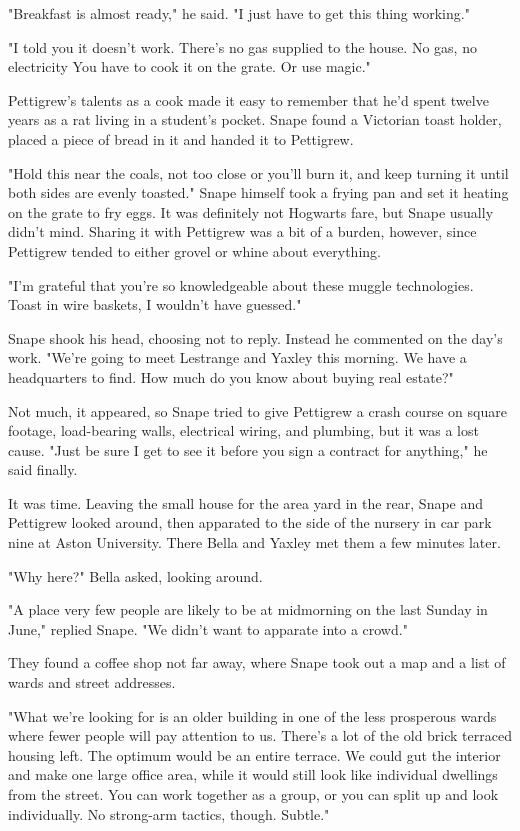 "Breakfast is almost ready," he said. "I just have to get this thing working."

"I told you it doesn't work. There's no gas supplied to the house. No gas, no electricity{\el} You have to cook it on the grate. Or use magic."

Pettigrew's talents as a cook made it easy to remember that he'd spent twelve years as a rat living in a student's pocket. Snape found a Victorian toast holder, placed a piece of bread in it and handed it to Pettigrew.

"Hold this near the coals, not too close or you'll burn it, and keep turning it until both sides are evenly toasted." Snape himself took a frying pan and set it heating on the grate to fry eggs. It was definitely not Hogwarts fare, but Snape usually didn't mind. Sharing it with Pettigrew was a bit of a burden, however, since Pettigrew tended to either grovel or whine about everything.

"I'm grateful that you're so knowledgeable about these muggle technologies. Toast in wire baskets, I wouldn't have guessed."

Snape shook his head, choosing not to reply. Instead he commented on the day's work. "We're going to meet Lestrange and Yaxley this morning. We have a headquarters to find. How much do you know about buying real estate?"

Not much, it appeared, so Snape tried to give Pettigrew a crash course on square footage, load-bearing walls, electrical wiring, and plumbing, but it was a lost cause. "Just be sure I get to see it before you sign a contract for anything," he said finally.

It was time. Leaving the small house for the area yard in the rear, Snape and Pettigrew looked around, then apparated to the side of the nursery in car park nine at Aston University. There Bella and Yaxley met them a few minutes later.

"Why here?" Bella asked, looking around.

"A place very few people are likely to be at midmorning on the last Sunday in June," replied Snape. "We didn't want to apparate into a crowd."

They found a coffee shop not far away, where Snape took out a map and a list of wards and street addresses.

"What we're looking for is an older building in one of the less prosperous wards where fewer people will pay attention to us. There's a lot of the old brick terraced housing left. The optimum would be an entire terrace. We could gut the interior and make one large office area, while it would still look like individual dwellings from the street. You can work together as a group, or you can split up and look individually. No strong-arm tactics, though. Subtle."


